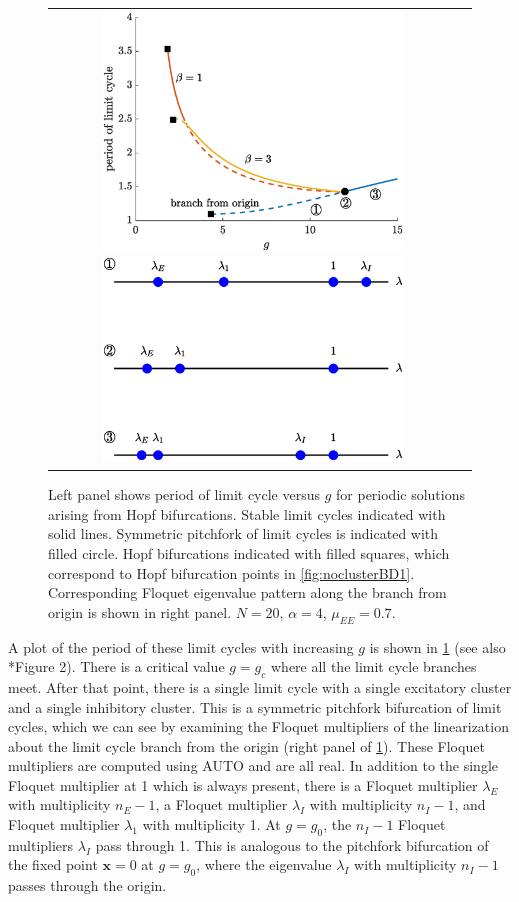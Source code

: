 \documentclass[11pt,reqno]{amsart}
\newcommand{\xvec}{\mathbf{x}}
\begin{document}
\begin{figure}
    \centering
    \begin{tabular}{cc}
    \includegraphics[width=8cm]{images/periodvsg}
    \includegraphics[width=8cm]{images/floquet1.eps}
    \end{tabular}
    \caption{Left panel shows period of limit cycle versus $g$ for periodic solutions arising from Hopf bifurcations. Stable limit cycles indicated with solid lines. Symmetric pitchfork of limit cycles is indicated with filled circle. Hopf bifurcations indicated with filled squares, which correspond to Hopf bifurcation points in \cref{fig:noclusterBD1}. Corresponding Floquet eigenvalue pattern along the branch from origin is shown in right panel.
    $N = 20$,  $\alpha = 4$, $\mu_{EE} = 0.7$.}
    \label{fig:periodvsg}
\end{figure}

A plot of the period of these limit cycles with increasing $g$ is shown in \cref{fig:periodvsg} (see also \cite{Barreiro2017}*{Figure 2}). There is a critical value $g = g_c$ where all the limit cycle branches meet. After that point, there is a single limit cycle with a single excitatory cluster and a single inhibitory cluster. This is a symmetric pitchfork bifurcation of limit cycles, which we can see by examining the Floquet multipliers of the linearization about the limit cycle branch from the origin (right panel of \cref{fig:periodvsg}). These Floquet multipliers are computed using AUTO and are all real. In addition to the single Floquet multiplier at 1 which is always present, there is a Floquet multiplier $\lambda_E$ with multiplicity $n_E - 1$, a Floquet multiplier $\lambda_I$ with multiplicity $n_I - 1$, and Floquet multiplier $\lambda_1$ with multiplicity 1. At $g = g_0$, the $n_I - 1$ Floquet multipliers $\lambda_I$ pass through 1. This is analogous to the pitchfork bifurcation of the fixed point $\xvec = 0$ at $g = g_0$, where the eigenvalue $\lambda_I$ with multiplicity $n_I - 1$ passes through the origin.
\end{document}
